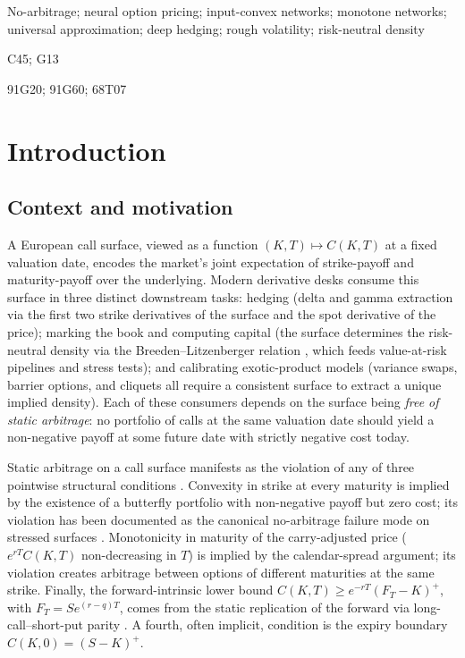 \documentclass[largeformat]{interact}
\let\cite\citep   %
\theoremstyle{plain}
\theoremstyle{definition}
\begin{document}
\begin{keywords}
No-arbitrage; neural option pricing; input-convex networks; monotone networks;
universal approximation; deep hedging; rough volatility; risk-neutral density
\end{keywords}

\begin{jelcode}
C45; G13
\end{jelcode}

\begin{amscode}
91G20; 91G60; 68T07
\end{amscode}

\section{Introduction}
\label{sec:intro}

\subsection{Context and motivation}
\label{sec:context}

A European call surface, viewed as a function $(K, T) \mapsto C(K, T)$ at a fixed valuation date, encodes the market's joint expectation of strike-payoff and maturity-payoff over the underlying. Modern derivative desks consume this surface in three distinct downstream tasks: hedging (delta and gamma extraction via the first two strike derivatives of the surface and the spot derivative of the price); marking the book and computing capital (the surface determines the risk-neutral density via the Breeden--Litzenberger relation \cite{breeden1978prices}, which feeds value-at-risk pipelines and stress tests); and calibrating exotic-product models (variance swaps, barrier options, and cliquets all require a consistent surface to extract a unique implied density). Each of these consumers depends on the surface being \emph{free of static arbitrage}: no portfolio of calls at the same valuation date should yield a non-negative payoff at some future date with strictly negative cost today.

Static arbitrage on a call surface manifests as the violation of any of three pointwise structural conditions \cite{cousot2007conditions,roper2010arbitrage,davis2007arbitrage}. Convexity in strike at every maturity is implied by the existence of a butterfly portfolio with non-negative payoff but zero cost; its violation has been documented as the canonical no-arbitrage failure mode on stressed surfaces \cite{kahale2004arbitrage,fengler2009arbitrage}. Monotonicity in maturity of the carry-adjusted price ($e^{rT}C(K,T)$ non-decreasing in $T$) is implied by the calendar-spread argument; its violation creates arbitrage between options of different maturities at the same strike. Finally, the forward-intrinsic lower bound $C(K, T) \geq e^{-rT}(F_T - K)^+$, with $F_T = Se^{(r-q)T}$, comes from the static replication of the forward via long-call--short-put parity \cite{merton1973theory}. A fourth, often implicit, condition is the expiry boundary $C(K, 0) = (S - K)^+$.
\end{document}
